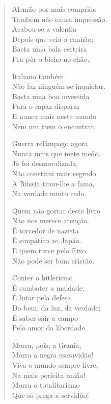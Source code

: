 \begin{verse}
Alemão por mais comprido\\
Também não causa impressão.\\
Acabou-se a valentia\\
Depois que veio o canhão;\\
Basta uma bala certeira\\
Pra pôr o bicho no chão.

Italiano também\\
Não faz ninguém se inquietar.\\
Basta uma boa investida\\
Para o rapaz disparar\\
E nunca mais neste mundo\\
Nem um trem o encontrar.

Guerra relâmpago agora\\
Nunca mais que mete medo.\\
Já foi desmoralizada,\\
Não constitui mais segredo.\\
A Rússia tirou-lhe a fama,\\
Na verdade muito cedo.


Quem não gostar deste livro\\
Não nos merece atenção.\\
É torcedor de nazista\\
É simpático ao Japão.\\
E quem torce pelo Eixo\\
Não pode ser bom cristão.

Conter o hitlerismo\\
É combater a maldade;\\
É lutar pela defesa\\
Do bem, da luz, da verdade;\\
É saber sair a campo\\
Pelo amor da liberdade.

Morra, pois, a tirania,\\
Morra a negra escravidão! \\
Viva o mundo sempre livre,\\
Na mais perfeita união!\\
Morra o totalitarismo\\
Que só prega a servidão!
\end{verse}


